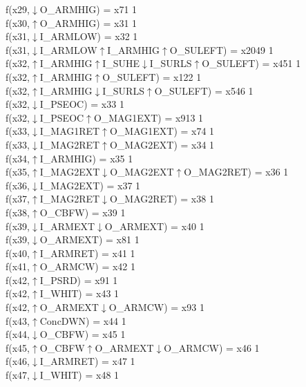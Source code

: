 f(x29,$\downarrow$O\_ARMHIG) = x71 {1} \\
f(x30,$\uparrow$O\_ARMHIG) = x31 {1} \\
f(x31,$\downarrow$I\_ARMLOW) = x32 {1} \\
f(x31,$\downarrow$I\_ARMLOW$\uparrow$I\_ARMHIG$\uparrow$O\_SULEFT) = x2049 {1} \\
f(x32,$\uparrow$I\_ARMHIG$\uparrow$I\_SUHE$\downarrow$I\_SURLS$\uparrow$O\_SULEFT) = x451 {1} \\
f(x32,$\uparrow$I\_ARMHIG$\uparrow$O\_SULEFT) = x122 {1} \\
f(x32,$\uparrow$I\_ARMHIG$\downarrow$I\_SURLS$\uparrow$O\_SULEFT) = x546 {1} \\
f(x32,$\downarrow$I\_PSEOC) = x33 {1} \\
f(x32,$\downarrow$I\_PSEOC$\uparrow$O\_MAG1EXT) = x913 {1} \\
f(x33,$\downarrow$I\_MAG1RET$\uparrow$O\_MAG1EXT) = x74 {1} \\
f(x33,$\downarrow$I\_MAG2RET$\uparrow$O\_MAG2EXT) = x34 {1} \\
f(x34,$\uparrow$I\_ARMHIG) = x35 {1} \\
f(x35,$\uparrow$I\_MAG2EXT$\downarrow$O\_MAG2EXT$\uparrow$O\_MAG2RET) = x36 {1} \\
f(x36,$\downarrow$I\_MAG2EXT) = x37 {1} \\
f(x37,$\uparrow$I\_MAG2RET$\downarrow$O\_MAG2RET) = x38 {1} \\
f(x38,$\uparrow$O\_CBFW) = x39 {1} \\
f(x39,$\downarrow$I\_ARMEXT$\downarrow$O\_ARMEXT) = x40 {1} \\
f(x39,$\downarrow$O\_ARMEXT) = x81 {1} \\
f(x40,$\uparrow$I\_ARMRET) = x41 {1} \\
f(x41,$\uparrow$O\_ARMCW) = x42 {1} \\
f(x42,$\uparrow$I\_PSRD) = x91 {1} \\
f(x42,$\uparrow$I\_WHIT) = x43 {1} \\
f(x42,$\uparrow$O\_ARMEXT$\downarrow$O\_ARMCW) = x93 {1} \\
f(x43,$\uparrow$ConcDWN) = x44 {1} \\
f(x44,$\downarrow$O\_CBFW) = x45 {1} \\
f(x45,$\uparrow$O\_CBFW$\uparrow$O\_ARMEXT$\downarrow$O\_ARMCW) = x46 {1} \\
f(x46,$\downarrow$I\_ARMRET) = x47 {1} \\
f(x47,$\downarrow$I\_WHIT) = x48 {1} \\
